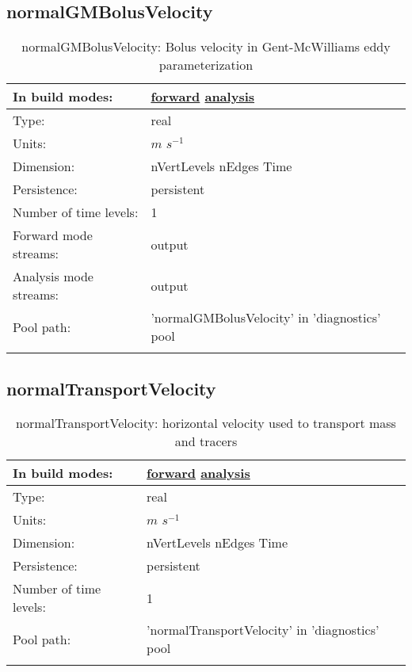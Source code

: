 \subsection[normalGMBolusVelocity]{normalGMBolusVelocity}
\label{subsec:var_sec_diagnostics_normalGMBolusVelocity}
\begin{center}
\begin{longtable}{| p{2.0in} | p{4.0in} |}
        \hline 
        In build modes: & \hyperref[subsec:forward_var_tab_diagnostics]{forward} \hyperref[subsec:analysis_var_tab_diagnostics]{analysis} \\
        \hline 
        Type: & real \\
        \hline 
        Units: & $m$ $s^{-1}$ \\
        \hline 
        Dimension: & nVertLevels nEdges Time \\
        \hline 
        Persistence: & persistent \\
        \hline 
        Number of time levels: & 1 \\
        \hline 
		 Forward mode streams: &  output \\
        \hline 
		 Analysis mode streams: &  output \\
        \hline 
            Pool path: & 'normalGMBolusVelocity' in 'diagnostics' pool
 \\
		 \hline 
    \caption{normalGMBolusVelocity: Bolus velocity in Gent-McWilliams eddy parameterization}
\end{longtable}
\end{center}
\subsection[normalTransportVelocity]{normalTransportVelocity}
\label{subsec:var_sec_diagnostics_normalTransportVelocity}
\begin{center}
\begin{longtable}{| p{2.0in} | p{4.0in} |}
        \hline 
        In build modes: & \hyperref[subsec:forward_var_tab_diagnostics]{forward} \hyperref[subsec:analysis_var_tab_diagnostics]{analysis} \\
        \hline 
        Type: & real \\
        \hline 
        Units: & $m$ $s^{-1}$ \\
        \hline 
        Dimension: & nVertLevels nEdges Time \\
        \hline 
        Persistence: & persistent \\
        \hline 
        Number of time levels: & 1 \\
        \hline 
            Pool path: & 'normalTransportVelocity' in 'diagnostics' pool
 \\
		 \hline 
    \caption{normalTransportVelocity: horizontal velocity used to transport mass and tracers}
\end{longtable}
\end{center}
